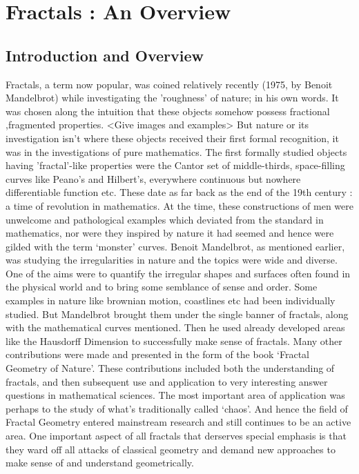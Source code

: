 
\chapter{Fractals : An Overview} %

\label{Chapter4} %


\section{Introduction and Overview}
Fractals, a term now popular, was coined relatively recently (1975, by Benoit
Mandelbrot) while investigating the 'roughness' of nature; in his own words.
It was chosen along the intuition that these objects somehow possess fractional
,fragmented properties.
<Give images and examples> 
\newline
But nature or its investigation isn't where these objects received their first
formal recognition, it was in the investigations of pure mathematics. The first
formally studied objects having 'fractal'-like properties were the Cantor set of
middle-thirds, space-filling curves like Peano's and Hilbert's,
everywhere continuous but nowhere differentiable function etc. These date as far
back as the end of the 19th century : a time of revolution in mathematics. 
At the time, these constructions of men
were unwelcome and pathological examples which deviated from the standard in
mathematics, nor were they inspired by nature it had
seemed and hence were gilded with
the term `monster' curves.
\newline
Benoit Mandelbrot, as mentioned earlier, was studying the irregularities in
nature and the topics were wide and diverse. One of the aims were to quantify
the irregular shapes and surfaces often found in the physical world
and to bring some semblance of sense and order. Some examples in nature like
brownian motion, coastlines etc had been individually studied. But Mandelbrot
brought them under the single banner of fractals, along with the mathematical
curves mentioned. Then he used already developed areas like the Hausdorff
Dimension to successfully make sense of fractals. Many other contributions were
made and presented in the form of the book `Fractal Geometry of Nature'. These
contributions included both the understanding of fractals, and then subsequent
use and application to very interesting answer questions in mathematical
sciences. The most important area of application was perhaps to the study of
what's traditionally called `chaos'. And hence the field of Fractal Geometry
entered mainstream research and still continues to be an active area.
\newline One important aspect of all fractals that derserves special emphasis is
that they ward off all attacks of classical geometry and demand new approaches
to make sense of and understand geometrically.


